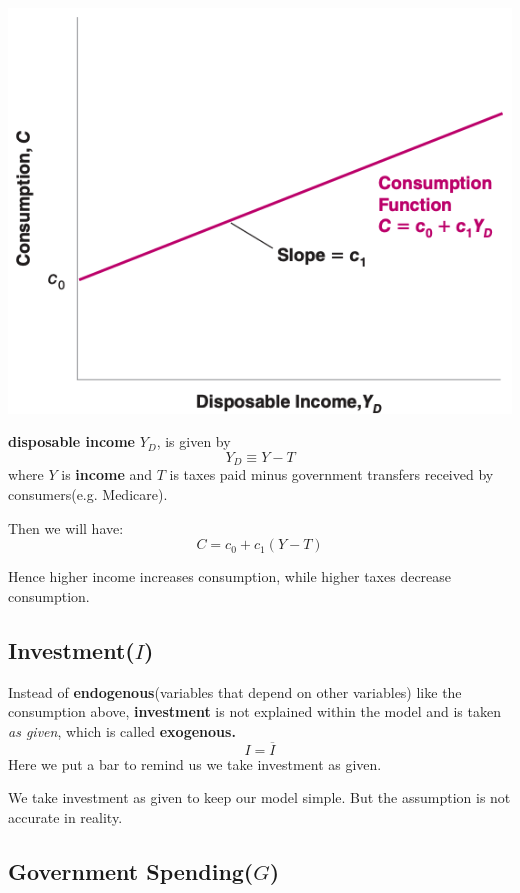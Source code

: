 \documentclass[11pt, a4paper]{ECON2123}
\begin{document}
\begin{spacing}{1.5}
    \begin{center}
        \includegraphics[scale=0.4]{images/03-c-yd.png}
    \end{center}

    {\bf disposable income }$Y_D$, is given by 
    $$Y_D\equiv Y-T$$
    where $Y$ is {\bf income } and $T$ is taxes paid minus government 
    transfers received by consumers(e.g. Medicare).

    Then we will have: 
    $$C=c_0+c_1(Y-T)$$

    Hence higher income increases consumption, while higher taxes 
    decrease consumption.



    \subsection{Investment($I$)}

    Instead of {\bf endogenous}(variables that depend on other variables)
    like the consumption above, {\bf investment} is not explained within 
    the model and is taken {\it as given}, which is called {\bf exogenous.}
    $$I=\overline{I}$$
    Here we put a bar to remind us we take investment as given.

    We take investment as given to keep our model simple. 
    But the assumption is not accurate in reality.

    \subsection{Government Spending($G$)}


\end{spacing}
\end{document}
